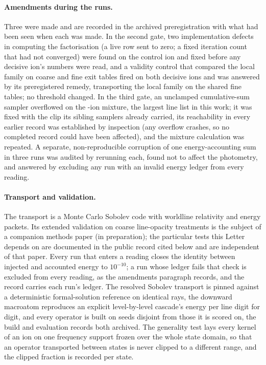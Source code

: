 \documentclass[aps,prl,twocolumn,superscriptaddress,nofootinbib,longbibliography]{revtex4-2}
\begin{document}
\paragraph{Amendments during the runs.} Three were made and are recorded
in the archived preregistration with what had been seen when each was
made. In the second gate, two implementation defects in computing the
factorisation (a live row sent to zero; a fixed iteration count that had
not converged) were found on the control ion and fixed before any decisive
ion's numbers were read, and a validity control that compared the local
family on coarse and fine exit tables fired on both decisive ions and was
answered by its preregistered remedy, transporting the local family on the
shared fine tables; no threshold changed. In the third gate, an unclamped
cumulative-sum sampler overflowed on the \PBBlendNIons-ion mixture, the
largest line list in this work; it was fixed with the clip its sibling
samplers already carried, its reachability in every earlier record was
established by inspection (any overflow crashes, so no completed record
could have been affected), and the mixture calculation was repeated. A
separate, non-reproducible corruption of one energy-accounting sum in
three runs was audited by rerunning each, found not to affect the
photometry, and answered by excluding any run with an invalid energy
ledger from every reading.

\paragraph{Transport and validation.} The transport is a Monte Carlo
Sobolev code with worldline relativity and energy packets. Its extended
validation on coarse line-opacity treatments is the subject of a companion
methods paper (in preparation); the particular tests this Letter depends on
are documented in the public record cited below and are independent of
that paper. Every run that enters a reading closes the identity between
injected and accounted energy to $10^{-10}$; a run whose ledger fails that
check is excluded from every reading, as the amendments paragraph
records, and the record carries each run's ledger. The resolved Sobolev transport is pinned against a deterministic
formal-solution reference on identical rays, the downward macroatom
reproduces an explicit level-by-level cascade's energy per line digit for
digit, and every operator is built on seeds disjoint from those it is
scored on, the build and evaluation records both archived. The generality
test lays every kernel of an ion on one frequency support frozen over the
whole state domain, so that an operator transported between states is
never clipped to a different range, and the clipped fraction is recorded
per state.
\end{document}
